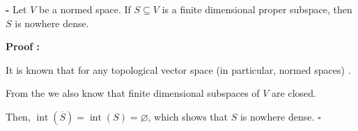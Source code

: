 \documentclass[12pt]{article}
\def\emptyset{\varnothing}
\begin{document}
{\bf {} -} Let $V$ be a normed space. If $S \subseteq V$ is a finite dimensional proper subspace, then $S$ is nowhere dense.

\textbf{Proof :}

It is known that for any topological vector space (in particular, normed spaces) .

From the   we also know that finite dimensional subspaces of $V$ are closed.

Then, $\operatorname{int}(\overline{S}) = \operatorname{int}(S) = \emptyset$, which shows that $S$ is nowhere dense. $\square$
\end{document}
